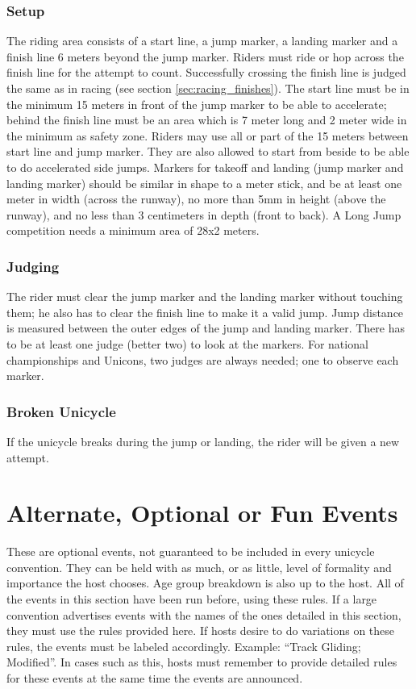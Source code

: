 \subsubsection{Setup}
The riding area consists of a start line, a jump marker, a landing marker and a finish line 6 meters beyond the jump marker.
Riders must ride or hop across the finish line for the attempt to count.
Successfully crossing the finish line is judged the same as in racing (see section \ref{sec:racing_finishes}).
The start line must be in the minimum 15 meters in front of the jump marker to be able to accelerate; behind the finish line must be an area which is 7 meter long and 2 meter wide in the minimum as safety zone.
Riders may use all or part of the 15 meters between start line and jump marker.
They are also allowed to start from beside to be able to do accelerated side jumps.
Markers for takeoff and landing (jump marker and landing marker) should be similar in shape to a meter stick, and be at least one meter in width (across the runway), no more than 5mm in height (above the runway), and no less than 3 centimeters in depth (front to back).
A Long Jump competition needs a minimum area of 28x2 meters.

\subsubsection{Judging}
The rider must clear the jump marker and the landing marker without touching them; he also has to clear the finish line to make it a valid jump.
Jump distance is measured between the outer edges of the jump and landing marker.
There has to be at least one judge (better two) to look at the markers.
For national championships and Unicons, two judges are always needed; one to observe each marker.

\subsubsection{Broken Unicycle}
If the unicycle breaks during the jump or landing, the rider will be given a new attempt.

\section{Alternate, Optional or Fun Events \label{sec:racing_alternate-optional-fun-events}}
These are optional events, not guaranteed to be included in every unicycle convention.
They can be held with as much, or as little, level of formality and importance the host chooses.
Age group breakdown is also up to the host.
All of the events in this section have been run before, using these rules.
If a large convention advertises events with the names of the ones detailed in this section, they must use the rules provided here.
If hosts desire to do variations on these rules, the events must be labeled accordingly.
Example: ``Track Gliding; Modified''.
In cases such as this, hosts must remember to provide detailed rules for these events at the same time the events are announced.

